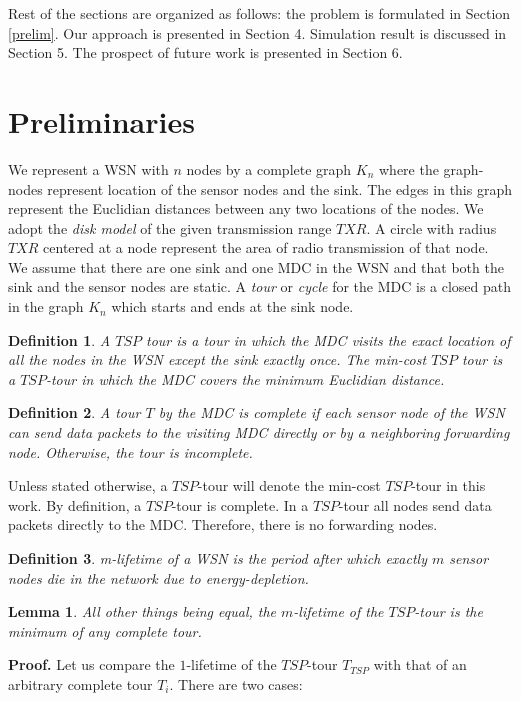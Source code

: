 \documentclass{llncs}
\newtheorem{mydef}{Definition}%
\newtheorem{mylemma}{Lemma}%
\begin{document}
 Rest of the sections are organized as follows: the problem is formulated in Section \ref{prelim}.
 Our approach is presented in Section 4. Simulation result is discussed in Section 5. The prospect
 of future work is presented in Section 6.
\section{Preliminaries \label{prelim}}
We represent a WSN with $n$ nodes by a complete graph $K_n$ where the graph-nodes represent location
of the sensor nodes and the sink. The edges in this graph represent the Euclidian distances
 between any
two locations of the nodes. We adopt the \textit{disk model} of the given transmission 
range $TXR$. A
circle with radius $TXR$ centered at a node represent the area of radio transmission of that node.
We assume that there are one sink and one MDC in the WSN and that both the sink and the sensor nodes
are static. 
A \textit{tour} or \textit{cycle} for the MDC is a closed path in the graph $K_n$ which starts
and ends at the sink node.
\begin{mydef}
	A $TSP$ tour is a tour in which the MDC visits the exact location of all the nodes in the WSN
	except the sink exactly once. The \textit{min-cost} $TSP$ tour is a $TSP$-tour in which the MDC covers the
	minimum Euclidian distance.
\end{mydef}
\begin{mydef}
	A tour $T$ by the MDC is \textit{complete} if each sensor node of the WSN can send data packets to
	the visiting MDC directly or by a neighboring forwarding node. Otherwise, the tour is
	\textit{incomplete}.
\end{mydef}
Unless stated otherwise, a $TSP$-tour will denote the min-cost $TSP$-tour in this work. By
definition, a $TSP$-tour is complete. In a $TSP$-tour all nodes send data packets directly to the
MDC. Therefore, there is no forwarding nodes.
\begin{mydef}
	\textit{m-lifetime} of a WSN is the period after which exactly $m$ sensor nodes die in the network
	due to energy-depletion.
\end{mydef}
\begin{mylemma}
	All other things being equal, the $m$-lifetime of the $TSP$-tour is the minimum of any complete
	tour.
\end{mylemma}
\textbf{Proof.} Let us compare the $1$-lifetime of the $TSP$-tour $T_{TSP}$ with that of an
arbitrary complete tour $T_i$. There are two cases:
\end{document}
